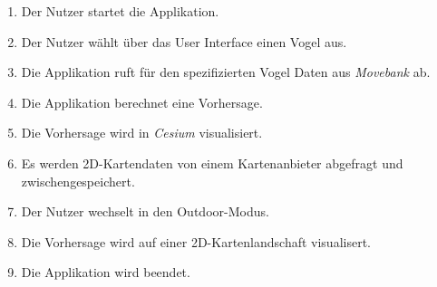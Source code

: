 \documentclass[12pt]{article} %
\newenvironment{cptenumerate}[1][label=\arabic*.]{\begin{enumerate}[#1] \setlength\itemsep{0em}}{\end{enumerate}}
\begin{document}
\begin{cptenumerate} 
 	 \item Der Nutzer startet die Applikation.
 	 \item Der Nutzer wählt über das User Interface einen Vogel aus.
 	 \item Die Applikation ruft für den spezifizierten Vogel Daten aus \textit{Movebank} ab.
 	 \item Die Applikation berechnet eine Vorhersage.
 	 \item Die Vorhersage wird in \textit{Cesium} visualisiert.
 	 \item Es werden 2D-Kartendaten von einem Kartenanbieter abgefragt und zwischengespeichert.
 	 \item Der Nutzer wechselt in den Outdoor-Modus.
 	 \item Die Vorhersage wird auf einer 2D-Kartenlandschaft visualisert.
 	 \item Die Applikation wird beendet.
\end{cptenumerate} 
\end{document}
